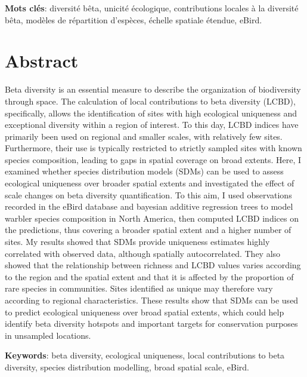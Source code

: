 \documentclass[12pt,twoside,maitrise]{template/dms}
\begin{document}
\textbf{Mots clés}: diversité bêta, unicité écologique, contributions locales à la diversité bêta, modèles de répartition d'espèces, échelle spatiale étendue, eBird.


\anglais
\chapter*{Abstract}

Beta diversity is an essential measure to describe the organization of biodiversity through space. The calculation of local contributions to beta diversity (LCBD), specifically, allows the identification of sites with high ecological uniqueness and exceptional diversity within a region of interest. To this day, LCBD indices have primarily been used on regional and smaller scales, with relatively few sites. Furthermore, their use is typically restricted to strictly sampled sites with known species composition, leading to gaps in spatial coverage on broad extents. Here, I examined whether species distribution models (SDMs) can be used to assess ecological uniqueness over broader spatial extents and investigated the effect of scale changes on beta diversity quantification. To this aim, I used observations recorded in the eBird database and bayesian additive regression trees to model warbler species composition in North America, then computed LCBD indices on the predictions, thus covering a broader spatial extent and a higher number of sites. My results showed that SDMs provide uniqueness estimates highly correlated with observed data, although spatially autocorrelated. They also showed that the relationship between richness and LCBD values varies according to the region and the spatial extent and that it is affected by the proportion of rare species in communities. Sites identified as unique may therefore vary according to regional characteristics. These results show that SDMs can be used to predict ecological uniqueness over broad spatial extents, which could help identify beta diversity hotspots and important targets for conservation purposes in unsampled locations.

\textbf{Keywords}: beta diversity, ecological uniqueness, local contributions to beta diversity, species distribution modelling, broad spatial scale, eBird.

\end{document}
